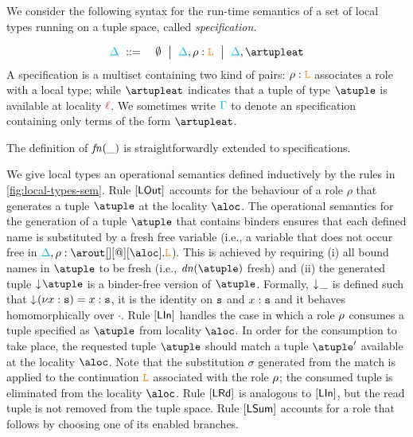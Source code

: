 We consider the following syntax for the run-time semantics of a set of local types running on a 
tuple space, called {\em specification}.

\begin{eqnarray*}
  \envmv & \bnfdef & \emptyset \bnfmid
                  \envmv, \arole :  \aL \bnfmid
                  \envmv, \artupleat                  
\end{eqnarray*}
%
A specification is a multiset containing two kind of pairs:  $\rho :  \texttt{\textcolor{orange}L}$   associates a 
role with a local type; while $\artupleat$  indicates that a 
tuple of type $\atuple$ is available at locality ${\color{red}\ell}$. 
%
We sometimes write $\textcolor{cyan}{\Gamma}$ to denote an specification containing only
terms of the form $\artupleat$. 

The definition of ${\it fn}(\_)$ is straightforwardly  extended to specifications. 

We give local types  an operational semantics defined inductively by 
the rules in \cref{fig:local-types-sem}. Rule $\mathsf{[LOut]}$ 
accounts  for the behaviour of a role $\rho$ that  generates a tuple $\atuple$ at the 
locality $\aloc$. The operational semantics for the generation of a tuple $\atuple$ that 
contains binders ensures that  each defined name  is substituted by a fresh free variable 
 (i.e., a variable that does not occur free in $\envmv, \arole : \arout[][@][\aloc].\aL$).
This is achieved by requiring  (i) all bound names in $\atuple$ to be fresh (i.e., $\dn\atuple$  fresh) and 
(ii)  the generated tuple $\eraseB\atuple$ is a binder-free version of $\atuple$. 
Formally, $\downarrow\!{\_}$ is defined  such that 
$\downarrow\!{(\nu x:\mathtt{s})} = x : \mathtt{s}$,  it is the identity on $\mathtt{s}$ and $x : \mathtt{s}$ and it behaves 
homomorphically over $\cdot$. Rule $\mathsf{[LIn]}$ handles the case in which a role $\rho$
consumes  a tuple specified as $\atuple$ from locality $\aloc$. In order for the consumption to
take place, the  requested tuple $\atuple$ should match  a tuple $\atuple'$ available 
at the locality $\aloc$. 
Note that the substitution $\sigma$ generated from the match is applied 
to the continuation $\texttt{\textcolor{orange}L}$ associated with the role $\rho$; the
consumed tuple is eliminated from the locality $\aloc$. 
%
Rule $\mathsf{[LRd]}$ is analogous to $\mathsf{[LIn]}$, but the 
read tuple is not removed from the tuple space.
%
Rule $\mathsf{[LSum]}$ accounts for a role that follows by choosing one of 
its enabled branches. 


